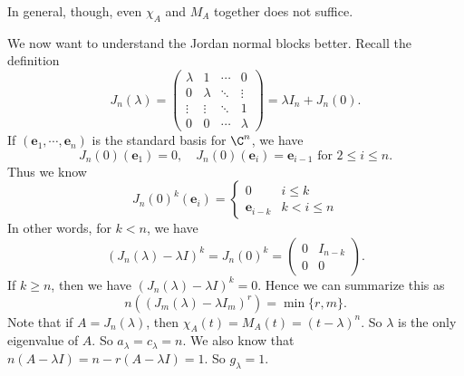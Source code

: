 \documentclass[a4paper]{article}
\begin{document}
In general, though, even $\chi_A$ and $M_A$ together does not suffice.

We now want to understand the Jordan normal blocks better. Recall the definition
\[
  J_n(\lambda) =
  \begin{pmatrix}
    \lambda & 1 & \cdots & 0\\
    0 & \lambda & \ddots & \vdots\\
    \vdots & \vdots & \ddots & 1\\
    0 & 0 & \cdots & \lambda
  \end{pmatrix} = \lambda I_n + J_n(0).
\]
If $(\mathbf{e}_1, \cdots, \mathbf{e}_n)$ is the standard basis for $\C^n$, we have
\[
  J_n(0)(\mathbf{e}_1) = 0, \quad J_n(0) (\mathbf{e}_i) = \mathbf{e}_{i - 1}\text{ for } 2\leq i \leq n.
\]
Thus we know
\[
  J_n(0)^k(\mathbf{e}_i) =
  \begin{cases}
    0 & i \leq k\\
    \mathbf{e}_{i - k} & k < i \leq n
  \end{cases}
\]
In other words, for $k < n$, we have
\[
  (J_n(\lambda) - \lambda I)^k = J_n(0)^k =
  \begin{pmatrix}
    0 & I_{n - k}\\
    0 & 0
  \end{pmatrix}.
\]
If $k \geq n$, then we have $(J_n(\lambda) - \lambda I)^k = 0$.
Hence we can summarize this as
\[
  n((J_m(\lambda) - \lambda I_m)^r) = \min\{r, m\}.
\]
Note that if $A = J_n(\lambda)$, then $\chi_A(t) = M_A(t) = (t - \lambda)^n$. So $\lambda$ is the only eigenvalue of $A$. So $a_\lambda = c_\lambda = n$. We also know that $n(A - \lambda I) = n - r(A - \lambda I) = 1$. So $g_\lambda = 1$.
\end{document}
